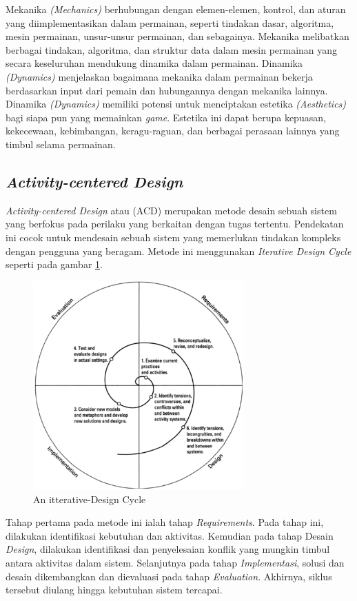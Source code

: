 Mekanika \textit{(Mechanics)} berhubungan dengan elemen-elemen, kontrol, dan aturan yang diimplementasikan dalam permainan, seperti tindakan dasar, algoritma, mesin permainan, unsur-unsur permainan, dan sebagainya.
Mekanika melibatkan berbagai tindakan, algoritma, dan struktur data dalam mesin permainan yang secara keseluruhan mendukung dinamika dalam permainan.
Dinamika \textit{(Dynamics)} menjelaskan bagaimana mekanika dalam permainan bekerja berdasarkan input dari pemain dan hubungannya dengan mekanika lainnya.
Dinamika \textit{(Dynamics)} memiliki potensi untuk menciptakan estetika \textit{(Aesthetics)} bagi siapa pun yang memainkan \textit{game}. Estetika ini dapat berupa kepuasan, kekecewaan, kebimbangan, keragu-raguan, dan berbagai perasaan lainnya yang timbul selama permainan.
\subsection{\textit{Activity-centered Design}}
\textit{Activity-centered Design} atau (ACD) merupakan metode desain sebuah sistem yang berfokus pada perilaku yang berkaitan dengan tugas tertentu.
Pendekatan ini cocok untuk mendesain sebuah sistem yang memerlukan tindakan kompleks dengan pengguna yang beragam. Metode ini menggunakan \textit{Iterative Design Cycle} seperti pada gambar \ref*{Fig:itterative-Design Cycle}.
\begin{figure}[H]
	\centering
	\includegraphics[height=8cm]{contents/chapter-2/images/Itterative-design.png}
	\caption{An itterative-Design Cycle \cite{2004activity}}
	\label{Fig:itterative-Design Cycle}
\end{figure}
Tahap pertama pada metode ini ialah tahap \textit{Requirements}. Pada tahap ini, dilakukan identifikasi kebutuhan dan aktivitas. 
Kemudian pada tahap Desain \textit{Design}, dilakukan identifikasi dan penyelesaian konflik yang mungkin timbul antara aktivitas dalam sistem.
Selanjutnya pada tahap \textit{Implementasi}, solusi dan desain dikembangkan dan dievaluasi pada tahap \textit{Evaluation}.
Akhirnya, siklus tersebut diulang hingga kebutuhan sistem tercapai.
